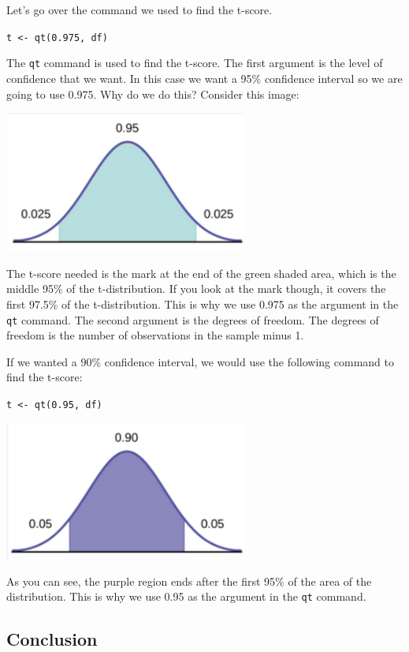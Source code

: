 \documentclass[
  letterpaper,
  DIV=11,
  numbers=noendperiod]{scrreprt}
\begin{document}
Let's go over the command we used to find the t-score.

\texttt{t\ \textless{}-\ qt(0.975,\ df)}

The \texttt{qt} command is used to find the t-score. The first argument
is the level of confidence that we want. In this case we want a 95\%
confidence interval so we are going to use 0.975. Why do we do this?
Consider this image:

\includegraphics[width=0.6\textwidth,height=\textheight]{./images/EPCI_9.jpg}

The t-score needed is the mark at the end of the green shaded area,
which is the middle 95\% of the t-distribution. If you look at the mark
though, it covers the first 97.5\% of the t-distribution. This is why we
use 0.975 as the argument in the \texttt{qt} command. The second
argument is the degrees of freedom. The degrees of freedom is the number
of observations in the sample minus 1.

If we wanted a 90\% confidence interval, we would use the following
command to find the t-score:

\texttt{t\ \textless{}-\ qt(0.95,\ df)}

\includegraphics[width=0.6\textwidth,height=\textheight]{./images/EPCI_10.jpg}

As you can see, the purple region ends after the first 95\% of the area
of the distribution. This is why we use 0.95 as the argument in the
\texttt{qt} command.

\subsection*{Conclusion}\label{conclusion-8}
\end{document}
